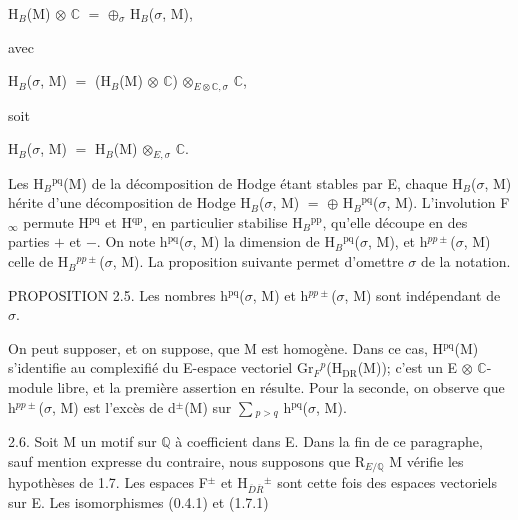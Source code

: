 \documentclass[10pt,twoside]{article}
\begin{document}
H\ensuremath{_{B}}(M) \ensuremath{⊗} \ensuremath{ℂ} \ensuremath{=} \ensuremath{⊕}\ensuremath{_{σ}} H\ensuremath{_{B}}(\ensuremath{σ}, M),\par
avec\par
H\ensuremath{_{B}}(\ensuremath{σ}, M) \ensuremath{=} (H\ensuremath{_{B}}(M) \ensuremath{⊗} \ensuremath{ℂ}) \ensuremath{⊗}\ensuremath{_{E⊗ℂ,σ}} \ensuremath{ℂ},\par
soit\par
H\ensuremath{_{B}}(\ensuremath{σ}, M) \ensuremath{=} H\ensuremath{_{B}}(M) \ensuremath{⊗}\ensuremath{_{E,σ}} \ensuremath{ℂ}.\par
Les H\ensuremath{_{B}}\ensuremath{^{\mathrm{pq}}}(M) de la décomposition de Hodge étant stables par E, chaque H\ensuremath{_{B}}(\ensuremath{σ}, M) hérite d’une décomposition de Hodge H\ensuremath{_{B}}(\ensuremath{σ}, M) \ensuremath{=} \ensuremath{⊕} H\ensuremath{_{B}}\ensuremath{^{\mathrm{pq}}}(\ensuremath{σ}, M). L’involution F\ensuremath{_{∞}} permute H\ensuremath{^{\mathrm{pq}}} et H\ensuremath{^{\mathrm{qp}}}, en particulier stabilise H\ensuremath{_{B}}\ensuremath{^{\mathrm{pp}}}, qu’elle découpe en des parties \ensuremath{+} et \ensuremath{−}. On note h\ensuremath{^{\mathrm{pq}}}(\ensuremath{σ}, M) la dimension de H\ensuremath{_{B}}\ensuremath{^{\mathrm{pq}}}(\ensuremath{σ}, M), et h\ensuremath{^{pp±}}(\ensuremath{σ}, M) celle de H\ensuremath{_{B}}\ensuremath{^{pp±}}(\ensuremath{σ}, M). La proposition suivante permet d’omettre \ensuremath{σ} de la notation.\par
PROPOSITION 2.5. Les nombres h\ensuremath{^{\mathrm{pq}}}(\ensuremath{σ}, M) et h\ensuremath{^{pp±}}(\ensuremath{σ}, M) sont indépendant de \ensuremath{σ}.\par
On peut supposer, et on suppose, que M est homogène. Dans ce cas, H\ensuremath{^{\mathrm{pq}}}(M) s’identifie au complexifié du E-espace vectoriel Gr\ensuremath{_{F}}\ensuremath{^{p}}(H\ensuremath{_{\mathrm{DR}}}(M)); c’est un E \ensuremath{⊗} \ensuremath{ℂ}-module libre, et la première assertion en résulte. Pour la seconde, on observe que h\ensuremath{^{pp±}}(\ensuremath{σ}, M) est l’excès de d\ensuremath{^{±}}(M) sur \ensuremath{∑}\ensuremath{_{p>q}} h\ensuremath{^{\mathrm{pq}}}(\ensuremath{σ}, M).\par
2.6. Soit M un motif sur \ensuremath{ℚ} à coefficient dans E. Dans la fin de ce paragraphe, sauf mention expresse du contraire, nous supposons que R\ensuremath{_{E/ℚ}} M vérifie les hypothèses de 1.7. Les espaces F\ensuremath{^{±}} et H\ensuremath{_{\overline{D}\overline{R}}}\ensuremath{^{±}} sont cette fois des espaces vectoriels sur E. Les isomorphismes (0.4.1) et (1.7.1)\par
\end{document}
